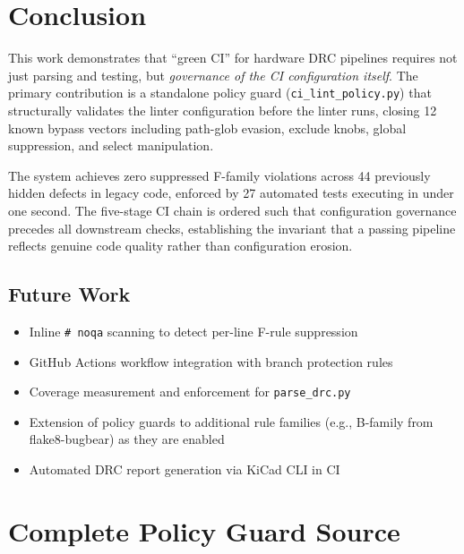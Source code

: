 \documentclass[11pt,a4paper]{article}
\begin{document}
\section{Conclusion}
\label{sec:conclusion}

This work demonstrates that ``green CI'' for hardware DRC pipelines requires
not just parsing and testing, but \emph{governance of the CI configuration itself}.
The primary contribution is a standalone policy guard (\texttt{ci\_lint\_policy.py})
that structurally validates the linter configuration before the linter runs,
closing 12 known bypass vectors including path-glob evasion, exclude knobs,
global suppression, and select manipulation.

The system achieves zero suppressed F-family violations across 44 previously
hidden defects in legacy code, enforced by 27 automated tests executing in
under one second. The five-stage CI chain is ordered such that configuration
governance precedes all downstream checks, establishing the invariant that
a passing pipeline reflects genuine code quality rather than configuration
erosion.

\subsection{Future Work}

\begin{itemize}
    \item Inline \texttt{\# noqa} scanning to detect per-line F-rule suppression
    \item GitHub Actions workflow integration with branch protection rules
    \item Coverage measurement and enforcement for \texttt{parse\_drc.py}
    \item Extension of policy guards to additional rule families (e.g., B-family
          from flake8-bugbear) as they are enabled
    \item Automated DRC report generation via KiCad CLI in CI
\end{itemize}

\appendix

\section{Complete Policy Guard Source}
\label{app:policy}
\end{document}
